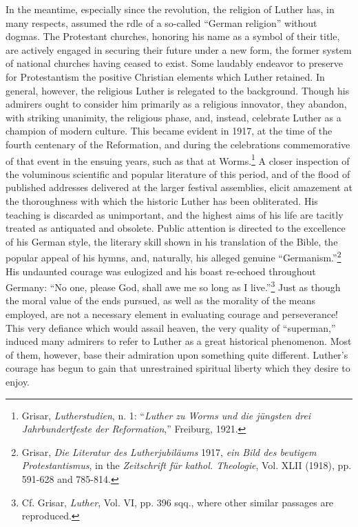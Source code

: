 In the meantime, especially since the revolution, the religion of
Luther has, in many respects, assumed the rdle of a so-called “German
religion” without dogmas. The Protestant churches, honoring his
name as a symbol of their title, are actively engaged in securing their
future under a new form, the former system of national churches
having ceased to exist. Some laudably endeavor to preserve for Protestantism
the positive Christian elements which Luther retained. In
general, however, the religious Luther is relegated to the background.
Though his admirers ought to consider him primarily as a religious
innovator, they abandon, with striking unanimity, the religious phase,
and, instead, celebrate Luther as a champion of modern culture. This
became evident in 1917, at the time of the fourth centenary of the
Reformation, and during the celebrations commemorative of that
event in the ensuing years, such as that at Worms.\footnote
{Grisar, \textit{Lutherstudien}, n. 1: “\textit{Luther zu Worms und die jüngsten drei Jahrbundertfeste
der Reformation},” Freiburg, 1921.}
A closer inspection
of the voluminous scientific and popular literature of this period, and
of the flood of published addresses delivered at the larger
festival assemblies, elicit amazement at the thoroughness with which
the historic Luther has been obliterated. His teaching is discarded as
unimportant, and the highest aims of his life are tacitly treated as
antiquated and obsolete. Public attention is directed to the excellence
of his German style, the literary skill shown in his translation of the
Bible, the popular appeal of his hymns, and, naturally, his alleged
genuine “Germanism.”\footnote
{Grisar, \textit{Die Literatur des Lutherjubiläums} 1917, \textit{ein Bild des beutigem Protestantismus},
in the \textit{Zeitschrift für kathol. Theologie}, Vol. XLII (1918), pp. 591-628 and 785-814.}
His undaunted courage was eulogized and
his boast re-echoed throughout Germany: “No one, please God, shall
awe me so long as I live.”\footnote{Cf. Grisar, \textit{Luther}, Vol. VI, pp. 396 sqq., where other similar passages are reproduced.}
Just as though the moral value of the
ends pursued, as well as the morality of the means employed, are not
a necessary element in evaluating courage and perseverance! This
very defiance which would assail heaven, the very quality of
“superman,” induced many admirers to refer to Luther as a great
historical phenomenon. Most of them, however, base their admiration upon
something quite different. Luther’s courage has begun to
gain that unrestrained spiritual liberty which they desire to enjoy.
